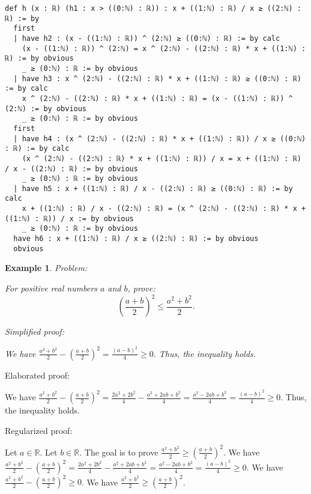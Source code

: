 \documentclass{article}
\newtheorem{example}{Example}
\begin{document}
\begin{tcolorbox}[colback=white!10, width=\linewidth]
\begin{lstlisting}[language=Lean4]
def h (x : ℝ) (h1 : x > ((0:ℕ) : ℝ)) : x + ((1:ℕ) : ℝ) / x ≥ ((2:ℕ) : ℝ) := by
  first
  | have h2 : (x - ((1:ℕ) : ℝ)) ^ (2:ℕ) ≥ ((0:ℕ) : ℝ) := by calc
    (x - ((1:ℕ) : ℝ)) ^ (2:ℕ) = x ^ (2:ℕ) - ((2:ℕ) : ℝ) * x + ((1:ℕ) : ℝ) := by obvious
    _ ≥ (0:ℕ) : ℝ := by obvious
  | have h3 : x ^ (2:ℕ) - ((2:ℕ) : ℝ) * x + ((1:ℕ) : ℝ) ≥ ((0:ℕ) : ℝ) := by calc
    x ^ (2:ℕ) - ((2:ℕ) : ℝ) * x + ((1:ℕ) : ℝ) = (x - ((1:ℕ) : ℝ)) ^ (2:ℕ) := by obvious
    _ ≥ (0:ℕ) : ℝ := by obvious
  first
  | have h4 : (x ^ (2:ℕ) - ((2:ℕ) : ℝ) * x + ((1:ℕ) : ℝ)) / x ≥ ((0:ℕ) : ℝ) := by calc
    (x ^ (2:ℕ) - ((2:ℕ) : ℝ) * x + ((1:ℕ) : ℝ)) / x = x + ((1:ℕ) : ℝ) / x - ((2:ℕ) : ℝ) := by obvious
    _ ≥ (0:ℕ) : ℝ := by obvious
  | have h5 : x + ((1:ℕ) : ℝ) / x - ((2:ℕ) : ℝ) ≥ ((0:ℕ) : ℝ) := by calc
    x + ((1:ℕ) : ℝ) / x - ((2:ℕ) : ℝ) = (x ^ (2:ℕ) - ((2:ℕ) : ℝ) * x + ((1:ℕ) : ℝ)) / x := by obvious
    _ ≥ (0:ℕ) : ℝ := by obvious
  have h6 : x + ((1:ℕ) : ℝ) / x ≥ ((2:ℕ) : ℝ) := by obvious
  obvious

\end{lstlisting}
\end{tcolorbox}


\begin{example}
Problem:
\begin{tcolorbox}[colback=yellow!10, width=\linewidth]
For positive real numbers $a$ and $b$, prove:
    $$\left(\frac{a+b}{2}\right)^2 \leq \frac{a^2+b^2}{2}.$$
\end{tcolorbox}

Simplified proof:
\begin{tcolorbox}[colback=blue!10, width=\linewidth]
We have
$ \frac{a^2+b^2}{2} - \left(\frac{a+b}{2}\right)^2 = \frac{(a-b)^2}{4} \ge 0. $
Thus, the inequality holds.
\end{tcolorbox}
\end{example}

Elaborated proof:
\begin{tcolorbox}[colback=green!10, width=\linewidth]
We have
$ \frac{a^2+b^2}{2} - \left(\frac{a+b}{2}\right)^2 = \frac{2a^2+2b^2}{4} - \frac{a^2+2ab+b^2}{4} = \frac{a^2-2ab+b^2}{4} = \frac{(a-b)^2}{4} \ge 0. $
Thus, the inequality holds.
\end{tcolorbox}

Regularized proof:
\begin{tcolorbox}[colback=red!10, width=\linewidth]
Let $a\in\mathbb{R}$.
Let $b\in\mathbb{R}$.
The goal is to prove $\frac{a^2+b^2}{2} \ge {\left(\frac{a+b}{2}\right)}^2$.
We have $\frac{a^2+b^2}{2} - {\left(\frac{a+b}{2}\right)}^2 = \frac{2a^2+2b^2}{4} - \frac{a^2+2ab+b^2}{4} = \frac{a^2-2ab+b^2}{4} = \frac{{{(a-b)}}^2}{4} \ge 0$.
We have $\frac{a^2+b^2}{2} - {\left(\frac{a+b}{2}\right)}^2 \ge 0$.
We have $\frac{a^2+b^2}{2} \ge {\left(\frac{a+b}{2}\right)}^2$.
\end{tcolorbox}
\end{document}
